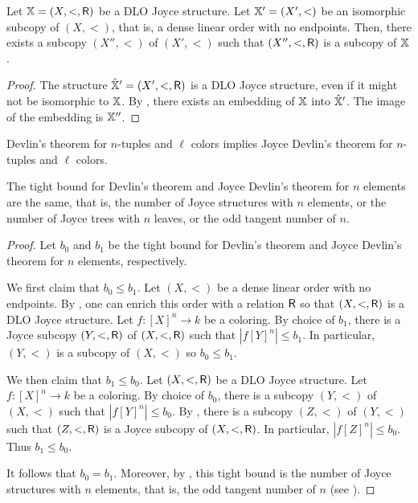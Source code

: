 \begin{theorem}[$\RCA_0$]\label{thm:suborder-to-subjoyce}
  Let $\mathbb{X}=(X,<,\mathsf{R})$ be a DLO Joyce structure. Let $\mathbb{X}'=(X',<)$ be an isomorphic subcopy of $(X,<)$, that is, a dense linear order with no endpoints. Then, there exists a subcopy $(X'',<)$ of $(X',<)$ such that $(X'',<,\mathsf{R})$ is a subcopy of $\mathbb{X}$.
\end{theorem}
\begin{proof}
  The structure $\hat{\mathbb{X}}'=(X',<,\mathsf{R})$ is a DLO Joyce structure, even if it might not be isomorphic to $\mathbb{X}$. By , there exists an embedding of $\mathbb{X}$ into $\hat{\mathbb{X}}'$. The image of the embedding is $\mathbb{X}''$.
\end{proof}

\begin{corollary}[$\RCA_0$]
  Devlin's theorem for $n$-tuples and $\ell$ colors implies Joyce Devlin's theorem for $n$-tuples and $\ell$ colors.
\end{corollary}

\begin{corollary}[$\RCA_0$]
  The tight bound for Devlin's theorem and Joyce Devlin's theorem  for $n$ elements are the same, that is, the number of Joyce structures with $n$ elements, or the number of Joyce trees with $n$ leaves, or the odd tangent number of $n$.
\end{corollary}
\begin{proof}
Let $b_0$ and $b_1$ be the tight bound for Devlin's theorem and Joyce Devlin's theorem for $n$ elements, respectively.

We first claim that $b_0 \leq b_1$.
Let $(X, <)$ be a dense linear order with no endpoints. By , one can enrich this order with a relation $\mathsf{R}$ so that $(X, <, \mathsf{R})$ is a DLO Joyce structure. Let $f: [X]^n \to k$ be a coloring. By choice of $b_1$, there is a Joyce subcopy $(Y, <, \mathsf{R})$ of $(X, <, \mathsf{R})$ such that $|f[Y]^n| \leq b_1$. In particular, $(Y, <)$ is a subcopy of $(X, <)$ so $b_0 \leq b_1$.

We then claim that $b_1 \leq b_0$.
Let $(X, <, \mathsf{R})$ be a DLO Joyce structure.  Let $f: [X]^n \to k$ be a coloring. By choice of $b_0$, there is a subcopy $(Y, <)$ of $(X, <)$ such that $|f[Y]^n| \leq b_0$.
By , there is a subcopy $(Z, <)$ of $(Y, <)$ such that $(Z, <, \mathsf{R})$ is a Joyce subcopy of $(X, <, \mathsf{R})$. In particular, $|f[Z]^n| \leq b_0$. Thus $b_1 \leq b_0$.

It follows that $b_0 = b_1$. Moreover, by , this tight bound is the number of Joyce structures with $n$ elements, that is, the odd tangent number of $n$ (see \cite[p.~147]{Todorcevic2010Ramsey}).
\end{proof}


